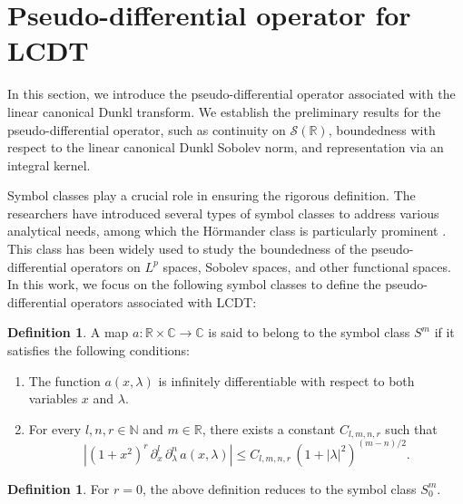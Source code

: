 \documentclass[12pt,a4paper,reqno]{amsproc}
\theoremstyle{definition}
\newtheorem{definition}[theorem]{Definition}
\theoremstyle{remark}
\numberwithin{equation}{section}
\begin{document}
\section{Pseudo-differential operator for LCDT} \label{C7-S3}
In this section, we introduce the pseudo-differential operator associated with the linear canonical Dunkl transform. We establish the preliminary results for the pseudo-differential operator, such as continuity on $\mathcal{S}(\mathbb{R})$, boundedness with respect to the linear canonical Dunkl Sobolev norm, and representation via an integral kernel.
\par Symbol classes play a crucial role in ensuring the rigorous definition. The researchers have introduced several types of symbol classes to address various analytical needs, among which the H\"ormander class is particularly prominent \cite{Hormander}. This class has been widely used to study the boundedness of the pseudo-differential operators on $L^p$
spaces, Sobolev spaces, and other functional spaces. In this work, we focus on the following symbol classes to define the pseudo-differential operators associated with LCDT:
\begin{definition} \label{C7-D:3.1}
 A map $ a: \mathbb{R}\times \mathbb{C}\rightarrow \mathbb{C}$ is said to belong to the symbol class $S^m$ if it satisfies the following conditions:
\begin{enumerate}[$(i)$]
    \item The function $a(x,\lambda)$ is infinitely differentiable with respect to both variables $x$ and $\lambda$.  
    \item [$(ii)$] For every $l,n,r \in \mathbb{N}$ and $m \in \mathbb{R}$, there exists a constant $C_{l,m,n,r}$ such that 
\begin{equation*}
    \left|(1+x^2)^r \,\partial^l_x\, \partial^n_\lambda\, a(x,\lambda) \right| \le C_{l,m,n,r} \, (1+|\lambda|^2)^{(m-n)/2}.
\end{equation*}
\end{enumerate}
\end{definition}
\begin{definition}\cite{Dachraoui} \label{C7-D3.1}
For $r=0$, the above definition reduces to the symbol class $S_0^m$.
\end{definition}
\end{document}
